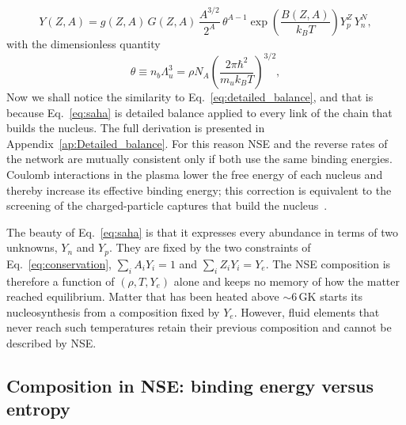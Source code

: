 \begin{equation}\label{eq:saha}
  Y(Z,A)=g(Z,A)\,G(Z,A)\,\frac{A^{3/2}}{2^A}\,\theta^{A-1}\exp\left(\frac{B(Z,A)}{k_BT}\right)Y_p^{Z}\,Y_n^{N},
\end{equation}
with the dimensionless quantity
\begin{equation}\label{eq:theta}
  \theta\equiv n_b\Lambda_u^3=\rho N_A\left(\frac{2\pi\hbar^2}{m_uk_BT}\right)^{3/2},
\end{equation}
Now we shall notice the similarity to Eq.~\ref{eq:detailed_balance}, and that is because Eq.~\ref{eq:saha} is detailed balance applied to every link of the chain that builds the nucleus.
The full derivation is presented in Appendix~\ref{ap:Detailed_balance}.
For this reason NSE and the reverse rates of the network are mutually consistent only if both use the same binding energies.
Coulomb interactions in the plasma lower the free energy of each nucleus and thereby increase its effective binding energy; this correction is equivalent to the screening of the charged-particle captures that build the nucleus~\cite{reichert_nuclear_2023}.
 
The beauty of Eq.~\ref{eq:saha} is that it expresses every abundance in terms of two unknowns, $Y_n$ and $Y_p$.
They are fixed by the two constraints of Eq.~\ref{eq:conservation}, $\sum_iA_iY_i=1$ and $\sum_iZ_iY_i=Y_e$.
The NSE composition is therefore a function of $(\rho,T,Y_e)$ alone and keeps no memory of how the matter reached equilibrium.
Matter that has been heated above $\sim6\,\mathrm{GK}$ starts its nucleosynthesis from a composition fixed by $Y_e$.
However, fluid elements that never reach such temperatures retain their previous composition and cannot be described by NSE.

\subsection{Composition in NSE: binding energy versus entropy}\label{sec:nse_composition}
 
